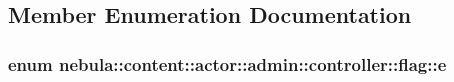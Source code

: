 \subsection{Member Enumeration Documentation}
\hypertarget{structnebula_1_1content_1_1actor_1_1admin_1_1controller_1_1flag_a18087a2b47a128a6330ee8c97d11f306}{
\subsubsection[{e}]{\setlength{\rightskip}{0pt plus 5cm}enum {\bf nebula::content::actor::admin::controller::flag::e}}}
\label{structnebula_1_1content_1_1actor_1_1admin_1_1controller_1_1flag_a18087a2b47a128a6330ee8c97d11f306}


